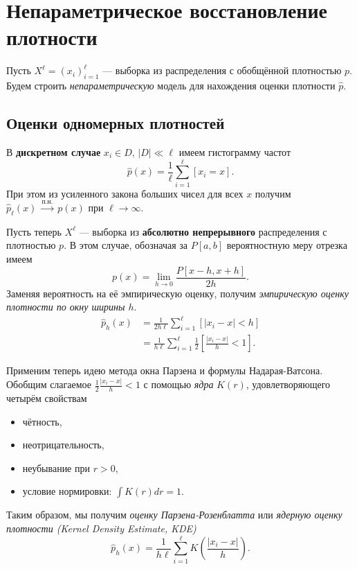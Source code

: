 {
\def\R{\mathbb{R}}
\def\E{\mathbb{E}}
\def\asto{\xrightarrow{\text{п.н.}}
}

\section{Непараметрическое восстановление плотности}

Пусть $ X^\ell = (x_i)_{i = 1}^\ell $ --- выборка из распределения с обобщённой
плотностью $p$. Будем строить \emph{непараметрическую} модель для нахождения оценки
плотности $\hat{p}$.

\subsection*{Оценки одномерных плотностей}
В \textbf{дискретном случае} $x_i \in D,\,|D| \ll \ell$ имеем гистограмму частот
\begin{equation*}
    \hat{p}(x) = \frac{1}{\ell}\sum_{i = 1}^\ell [x_i = x].
\end{equation*}
При этом из усиленного закона больших чисел для всех $x$ получим
$ \hat{p}_\ell(x)~\asto~p(x) $ при $ \ell \to \infty $.

Пусть теперь $X^\ell$ --- выборка из \textbf{абсолютно непрерывного}
распределения с плотностью $p$. В этом случае, обозначая за $P[a,b]$
вероятностную меру отрезка имеем
\begin{equation*}
    p(x) = \lim_{h \to 0}\frac{P[x - h, x + h]}{2h}.
\end{equation*}
Заменяя вероятность на её эмпирическую оценку, получим
\emph{эмпирическую оценку плотности по окну ширины $h$}.
\begin{align*}
    \hat{p}_h(x)
     & = \frac{1}{2h\ell}\sum_{i = 1}^\ell [|x_i - x| < h]                                 \\
     & = \frac{1}{h\ell}\sum_{i = 1}^\ell \frac{1}{2}\left[\frac{|x_i - x|}{h} < 1\right].
\end{align*}

Применим теперь идею метода окна Парзена и формулы Надарая-Ватсона. Обобщим
слагаемое $ \frac{1}{2}\frac{|x_i - x|}{h} < 1 $ с помощью \emph{ядра} $K(r)$,
удовлетворяющего четырём свойствам
\begin{itemize}
    \item чётность,
    \item неотрицательность,
    \item неубывание при $r > 0$,
    \item условие нормировки: $ \int K(r) dr = 1$.
\end{itemize}
Таким образом, мы получим \emph{оценку Парзена-Розенблатта} или
\emph{ядерную оценку плотности (Kernel Density Estimate, KDE)}
\begin{equation*}
    \hat{p}_h(x)
    = \frac{1}{h\ell}\sum_{i = 1}^\ell K\left(\frac{|x_i - x|}{h}\right).
\end{equation*}

}
